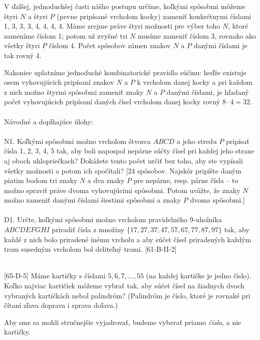 V ďalšej, jednoduchšej časti nášho postupu určíme, koľkými spôsobmi môžeme štyri $N$ a štyri $P$ (pevne pripísané vrcholom kocky) zameniť konkrétnymi číslami 1, 3, 3, 3, 4, 4, 4, 4. Máme zrejme práve štyri možnosti pre výber toho $N$, ktoré zameníme číslom 1; potom už zvyšné tri $N$ musíme zameniť číslom 3, rovnako ako všetky štyri $P$ číslom 4. Počet spôsobov zámen znakov $N$ a $P$ danými číslami je tak rovný 4.

Nakoniec uplatníme jednoduché kombinatorické pravidlo súčinu: keďže existuje osem vyhovujúcich pripísaní znakov $N$ a $P$ k vrcholom danej kocky a pri každom z nich možno štyrmi spôsobmi zameniť znaky $N$ a $P$ danými číslami, je hľadaný počet vyhovujúcich pripísaní daných čísel vrcholom danej kocky rovný $8 \cdot 4 = 32$.\\
\\
Návodné a dopľňajúce úlohy:\\
\\
N1. Koľkými spôsobmi možno vrcholom štvorca $ABCD$ a jeho stredu $P$ pripísať čísla 1, 2, 3, 4, 5 tak, aby boli napospol nepárne súčty čísel pri každej jeho strane aj oboch uhlopriečkach? Dokážete tento počet určiť bez toho, aby ste vypísali všetky možnosti a potom ich spočítali? [24 spôsobov. Najskôr pripíšte daným piatim bodom tri znaky $N$ a dva znaky $P$ pre nepárne, resp. párne čísla -- to možno spraviť práve
dvoma vyhovujúcimi spôsobmi. Potom uvážte, že znaky $N$ možno zameniť danými číslami šiestimi spôsobmi a znaky $P$ dvoma spôsobmi.]\\
\\
D1. Určte, koľkými spôsobmi možno vrcholom pravidelného 9-uholníka $ABCDEFGHI$ priradiť čísla z množiny $\{17, 27, 37, 47, 57, 67, 77, 87, 97\}$ tak, aby každé z nich bolo priradené inému vrcholu a aby súčet čísel priradených každým trom susedným vrcholom bol deliteľný tromi. [61-B-II-2]\\
\\
\begin{tcolorbox}[breakable,notitle,boxrule=0pt,colback=light-gray,colframe=light-gray]\ul [65-D-5] Máme kartičky s číslami $5, 6, 7, \ldots, 55$ (na každej kartičke je jedno číslo). Koľko najviac kartičiek môžeme vybrať tak, aby súčet čísel na žiadnych dvoch vybraných kartičkách nebol palindróm? (Palindróm je číslo, ktoré je rovnaké pri čítaní zľava doprava i sprava doľava.)

\end{tcolorbox}

\rieh Aby sme sa mohli stručnejšie vyjadrovať, budeme vyberať priamo \textit{čísla}, a nie kartičky.

